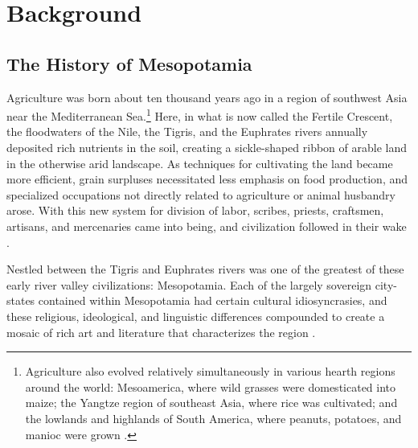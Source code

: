 \documentclass[10pt,a4paper]{article}
\begin{document}
\section{Background}
\subsection{The History of Mesopotamia}
%
%
Agriculture was born about ten thousand years ago in a region of southwest Asia near the Mediterranean Sea.\footnote{Agriculture also evolved relatively simultaneously in various hearth regions around the world: Mesoamerica, where wild grasses were domesticated into maize; the Yangtze region of southeast Asia, where rice was cultivated; and the lowlands and highlands of South America, where peanuts, potatoes, and manioc were grown \cite{brown2009complex}.} Here, in what is now called the Fertile Crescent, the floodwaters of the Nile, the Tigris, and the Euphrates rivers annually deposited rich nutrients in the soil, creating a sickle-shaped ribbon of arable land in the otherwise arid landscape\cite{nelson2015}. As techniques for cultivating the land became more efficient, grain surpluses necessitated less emphasis on food production, and specialized occupations not directly related to agriculture or animal husbandry arose.\cite{brown2009complex} With this new system for division of labor, scribes, priests, craftsmen, artisans, and mercenaries came into being, and civilization followed in their wake \cite{nelson2015}. 

Nestled between the Tigris and Euphrates rivers was one of the greatest of these early river valley civilizations: Mesopotamia. Each of the largely sovereign city-states contained within Mesopotamia had certain cultural idiosyncrasies, and these religious, ideological, and linguistic differences compounded to create a mosaic of rich art and literature that characterizes the region \cite{van1997ancient}. 
\end{document}
